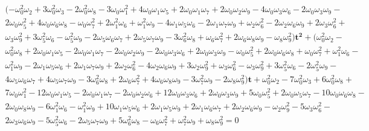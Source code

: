 \documentclass[a4paper,10pt]{amsart}
\theoremstyle{plain}
\theoremstyle{definition}
\theoremstyle{remark}
\numberwithin{equation}{section}
\begin{document}
 \begin{gather*}
(-\omega_{0}^2\omega_{2} + 3\omega_{0}^2\omega_{3} - 2\omega_{0}^2\omega_{8} - 3\omega_{0}\omega_{1}^2 + 4\omega_{0}\omega_{1}\omega_{5} +
    2\omega_{0}\omega_{1}\omega_{7} + 2\omega_{0}\omega_{2}\omega_{9} - 4\omega_{0}\omega_{3}\omega_{6} - 2\omega_{0}\omega_{3}\omega_{9} -\\
    2\omega_{0}\omega_{5}^2 +
 4\omega_{0}\omega_{6}\omega_{8} - \omega_{0}\omega_{7}^2 + 2\omega_{1}^2\omega_{6} + \omega_{1}^2\omega_{9} -
    4\omega_{1}\omega_{5}\omega_{6} - 2\omega_{1}\omega_{7}\omega_{9} + \omega_{2}\omega_{6}^2 - 2\omega_{2}\omega_{6}\omega_{9} +
    2\omega_{3}\omega_{6}^2 +\\ \omega_{3}\omega_{9}^2 + 3\omega_{5}^2\omega_{6} -
 \omega_{5}^2\omega_{9} - 2\omega_{5}\omega_{6}\omega_{7} +
    2\omega_{5}\omega_{7}\omega_{9} - 3\omega_{6}^2\omega_{8} + \omega_{6}\omega_{7}^2 + 2\omega_{6}\omega_{8}\omega_{9} - \omega_{8}\omega_{9}^2)\pmb{t^2}
    + (\omega_{0}^2\omega_{2} -\\ \omega_{0}^2\omega_{8} + 2\omega_{0}\omega_{1}\omega_{5} - 2\omega_{0}\omega_{1}\omega_{7} -
 2\omega_{0}\omega_{2}\omega_{9} -
    2\omega_{0}\omega_{3}\omega_{6} + 2\omega_{0}\omega_{3}\omega_{9} - \omega_{0}\omega_{5}^2 + 2\omega_{0}\omega_{6}\omega_{8} + \omega_{0}\omega_{7}^2 +
    \omega_{1}^2\omega_{6} -\\ \omega_{1}^2\omega_{9} - 2\omega_{1}\omega_{5}\omega_{6} + 2\omega_{1}\omega_{7}\omega_{9} + 2\omega_{2}\omega_{6}^2 -
    4\omega_{2}\omega_{6}\omega_{9} + 3\omega_{2}\omega_{9}^2 + \omega_{3}\omega_{6}^2 - \omega_{3}\omega_{9}^2 + 3\omega_{5}^2\omega_{6} -
    2\omega_{5}^2\omega_{9} -\\ 4\omega_{5}\omega_{6}\omega_{7} + 4\omega_{5}\omega_{7}\omega_{9} - 3\omega_{6}^2\omega_{8} + 2\omega_{6}\omega_{7}^2 +
    4\omega_{6}\omega_{8}\omega_{9} - 
3\omega_{7}^2\omega_{9} - 2\omega_{8}\omega_{9}^2)\pmb{t} + \omega_{0}^2\omega_{2} - 7\omega_{0}^2\omega_{3} + 6\omega_{0}^2\omega_{8} +\\
    7\omega_{0}\omega_{1}^2 - 12\omega_{0}\omega_{1}\omega_{5} - 2\omega_{0}\omega_{1}\omega_{7} - 2\omega_{0}\omega_{2}\omega_{6} + 12\omega_{0}\omega_{3}\omega_{6} + 
2\omega_{0}\omega_{3}\omega_{9}
    + 5\omega_{0}\omega_{5}^2 + 2\omega_{0}\omega_{5}\omega_{7} - 10\omega_{0}\omega_{6}\omega_{8} - \\2\omega_{0}\omega_{8}\omega_{9} - 6\omega_{1}^2\omega_{6} - \omega_{1}^2\omega_{9} +
    10\omega_{1}\omega_{5}\omega_{6} + 2\omega_{1}\omega_{5}\omega_{9} + 2\omega_{1}\omega_{6}\omega_{7} + 
2\omega_{2}\omega_{6}\omega_{9} - \omega_{2}\omega_{9}^2 - 5\omega_{3}\omega_{6}^2 -\\
    2\omega_{3}\omega_{6}\omega_{9} - 5\omega_{5}^2\omega_{6} - 2\omega_{5}\omega_{7}\omega_{9} + 5\omega_{6}^2\omega_{8} - \omega_{6}\omega_{7}^2 + \omega_{7}^2\omega_{9} +
    \omega_{8}\omega_{9}^2=0
    \end{gather*}
\end{document}

